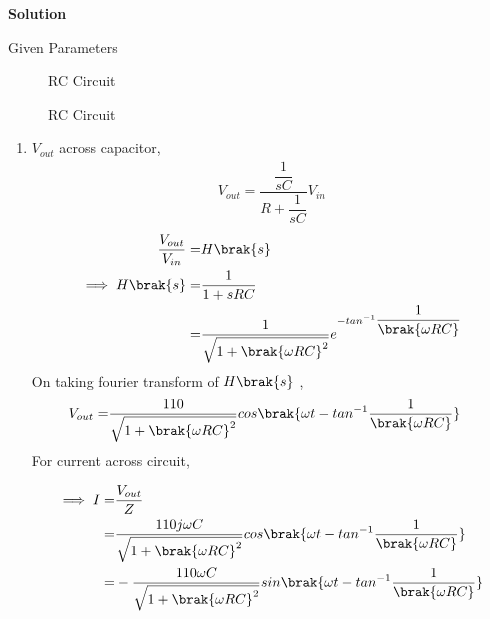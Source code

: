 \documentclass[journal,12pt,twocolumn]{IEEEtran}
\theoremstyle{remark}
\begin{document}
\textbf{Solution}
\begin{table}[!h]
	\centering
	
	\vspace{6 pt}
	\caption{Given Parameters}
	\label{tab:enter-label}
\end{table}
\begin{figure}[!h]
	\centering
	
	\caption{RC Circuit}
	\label{fig:1}
\end{figure}
\vspace{2cm}
\begin{figure}[!h]
	\centering
	
	\caption{RC Circuit}
	\label{fig:2}
\end{figure}
\begin{enumerate} [label = (\alph*)]
\item $V_{out }$ across capacitor,
\begin{align}
 V_{out}=\dfrac{\dfrac{1}{sC}}{ R + \dfrac{1}{sC}}
 V_{in}
\end{align}
\begin{align}
\dfrac{V_{out}}{V_{in}} =& H\brak{s}\\
\implies H\brak{s} =& \dfrac{1}{1+sRC}\\
                    =& \dfrac{1}{\sqrt{1+\brak{\omega RC}^2}}e^{-tan^{-1}\dfrac{1}{\brak{\omega RC}}}
\end{align}
On taking fourier transform of $H\brak{s}$ ,
\begin{align}
V_{out} =& \dfrac{110}{\sqrt{1+\brak{\omega RC}^2}}cos\brak{\omega t - tan^{-1}\dfrac{1}{\brak{\omega RC}}}
\end{align}
For current across circuit,

\begin{align} 
\implies I=& \dfrac{V_{out}}{Z}\\
		 =& \dfrac{110j\omega C}{\sqrt{1+\brak{\omega RC}^2}}cos\brak{\omega t - tan^{-1}\dfrac{1}{\brak{\omega RC}}}\\
		 =& -\dfrac{110\omega C}{\sqrt{1+\brak{\omega RC}^2}}sin\brak{\omega t - tan^{-1}\dfrac{1}{\brak{\omega RC}}}
\end{align}


\end{enumerate}
\end{document}

